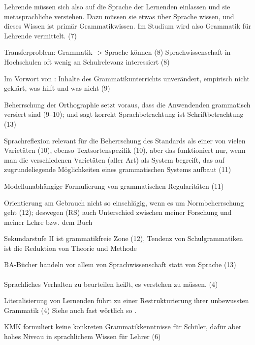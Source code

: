 Lehrende müssen sich also auf die Sprache der Lernenden einlassen und sie metasprachliche verstehen.
Dazu müssen sie etwas über Sprache wissen, und dieses Wissen ist primär Grammatikwissen.
Im Studium wird also Grammatik für Lehrende vermittelt. (7)

Transferproblem: Grammatik -> Sprache können (8)
Sprachwissenschaft in Hochschulen oft wenig an Schulrelevanz interessiert (8)

Im Vorwort von \citet[2]{KoepckeZiegler2013}: Inhalte des Grammatikunterrichts unverändert, empirisch nicht geklärt, was hilft und was nicht (9)

Beherrschung der Orthographie setzt voraus, dass die Anwendenden grammatisch versiert sind (9--10); und \citet{Duerscheid2013} sagt korrekt Sprachbetrachtung ist Schriftbetrachtung (13)

Sprachreflexion relevant für die Beherrschung des Standards als einer von vielen Varietäten (10), ebenso Textsortenspezifik (10), aber das funktioniert nur, wenn man die verschiedenen Varietäten (aller Art) als System begreift, das auf zugrundeliegende Möglichkeiten eines grammatischen Systems aufbaut (11)

Modellunabhängige Formulierung von grammatischen Regularitäten (11)

Orientierung am Gebrauch nicht so einschlägig, wenn es um Normbeherrschung geht (12); deswegen (RS) auch Unterschied zwischen meiner Forschung und meiner Lehre bzw. dem Buch

Sekundarstufe II ist grammatikfreie Zone (12), Tendenz von Schulgrammatiken ist die Reduktion von Theorie und Methode

BA-Bücher handeln vor allem von Sprachwissenschaft statt von Sprache (13)

\paragraph*{\citet{Eisenberg2004}}

Sprachliches Verhalten zu beurteilen heißt, es verstehen zu müssen. (4)

Literalisierung von Lernenden führt zu einer Restrukturierung ihrer unbewussten Grammatik (4) Siehe auch fast wörtlich so \citet[78]{Portmanntselikas2011}.

KMK formuliert keine konkreten Grammatikkenntnisse für Schüler, dafür aber hohes Niveau in sprachlichem Wissen für Lehrer (6)

